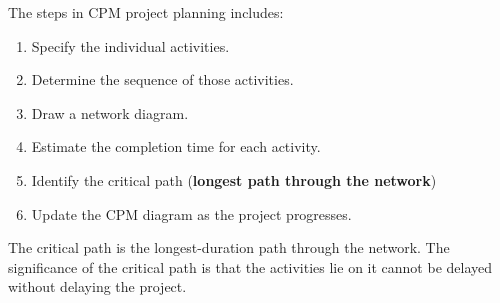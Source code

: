 \documentclass[article, 10pt,onecolumn]{article}
\begin{document}
The steps in CPM project planning includes: 
\begin{enumerate}
	\item Specify the individual activities.
	\item Determine the sequence of those activities.
	\item Draw a network diagram.
	\item Estimate the completion time for each activity.
	\item Identify the critical path (\textbf{longest path through the network})
	\item Update the CPM diagram as the project progresses.
\end{enumerate}

The critical path is the longest-duration path through the network. The significance of the critical path is that the activities lie on it cannot be delayed without delaying the project.

%


\end{document}
